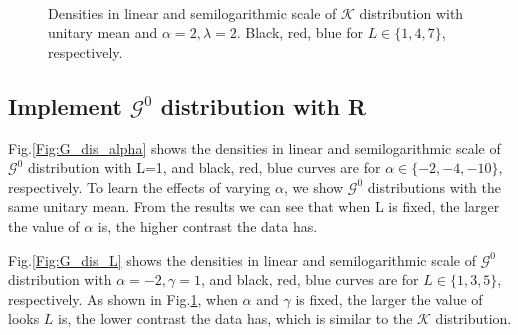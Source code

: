 \documentclass[conference,onecolumn]{IEEEtran}
\begin{document}
\begin{figure}[htb]
	\centering
	\ 
	\ 
	\caption{Densities in linear and semilogarithmic scale of $\mathcal{K}$ distribution with unitary mean and $\alpha=2,\lambda=2$. Black, red, blue for $L\in\{1,4,7\}$, respectively.}
	\label{Fig:K_dis_L}
\end{figure}


\subsection{Implement $\mathcal{G}^0$ distribution with R}

Fig.\ref{Fig:G_dis_alpha} shows the densities in linear and semilogarithmic scale of $\mathcal{G}^0$ distribution with L=1, and black, red, blue curves are for $\alpha\in\{-2,-4,-10\}$, respectively. To learn the effects of varying $\alpha$, we show  $\mathcal{G}^0$ distributions with the same unitary mean. From the results we can see that when L is fixed, the larger the value of $\alpha$ is, the higher contrast the data has.

Fig.\ref{Fig:G_dis_L} shows the densities in linear and semilogarithmic scale of $\mathcal{G}^0$ distribution with $\alpha=-2, \gamma=1$, and black, red, blue curves are for $L\in\{1,3,5\}$, respectively. As shown in Fig.\ref{Fig:K_dis_L}, when $\alpha$ and $\gamma$ is fixed, the larger the value of looks $L$ is, the lower contrast the data has, which is similar to the $\mathcal{K}$ distribution.
\end{document}
